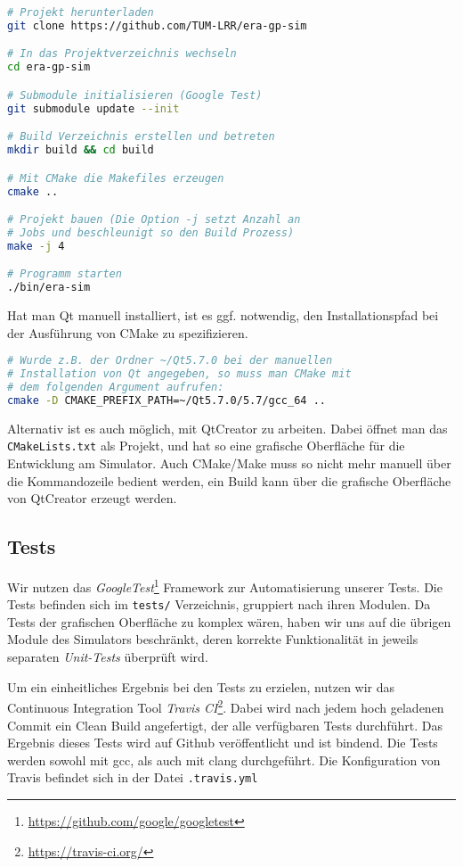 \begin{lstlisting}[language=bash, keywords={}]
# Projekt herunterladen
git clone https://github.com/TUM-LRR/era-gp-sim

# In das Projektverzeichnis wechseln
cd era-gp-sim

# Submodule initialisieren (Google Test)
git submodule update --init

# Build Verzeichnis erstellen und betreten
mkdir build && cd build

# Mit CMake die Makefiles erzeugen
cmake ..

# Projekt bauen (Die Option -j setzt Anzahl an
# Jobs und beschleunigt so den Build Prozess)
make -j 4

# Programm starten
./bin/era-sim
\end{lstlisting}

Hat man Qt manuell installiert, ist es ggf. notwendig, den Installationspfad bei der
Ausführung von CMake zu spezifizieren.

\begin{lstlisting}[language=bash, keywords={}]
# Wurde z.B. der Ordner ~/Qt5.7.0 bei der manuellen
# Installation von Qt angegeben, so muss man CMake mit
# dem folgenden Argument aufrufen:
cmake -D CMAKE_PREFIX_PATH=~/Qt5.7.0/5.7/gcc_64 ..
\end{lstlisting}

Alternativ ist es auch möglich, mit QtCreator zu arbeiten. Dabei öffnet man das
\texttt{CMakeLists.txt} als Projekt, und hat so eine grafische Oberfläche für
die Entwicklung am Simulator. Auch CMake/Make muss so nicht mehr manuell über
die Kommandozeile bedient werden, ein Build kann über die grafische Oberfläche
von QtCreator erzeugt werden.

\subsection{Tests}

Wir nutzen das
\emph{GoogleTest}\footnote{\url{https://github.com/google/googletest}} Framework
zur Automatisierung unserer Tests. Die Tests befinden sich im \texttt{tests/}
Verzeichnis, gruppiert nach ihren Modulen. Da Tests der grafischen Oberfläche zu
komplex wären, haben wir uns auf die übrigen Module des Simulators beschränkt,
deren korrekte Funktionalität in jeweils separaten \emph{Unit-Tests} überprüft
wird.

Um ein einheitliches Ergebnis bei den Tests zu erzielen, nutzen wir das
Continuous Integration Tool \emph{Travis
CI}\footnote{\url{https://travis-ci.org/}}. Dabei wird nach jedem hoch geladenen
Commit ein Clean Build angefertigt, der alle verfügbaren Tests durchführt. Das
Ergebnis dieses Tests wird auf Github veröffentlicht und ist bindend. Die Tests
werden sowohl mit gcc, als auch mit clang durchgeführt. Die Konfiguration von
Travis befindet sich in der Datei \texttt{.travis.yml}

